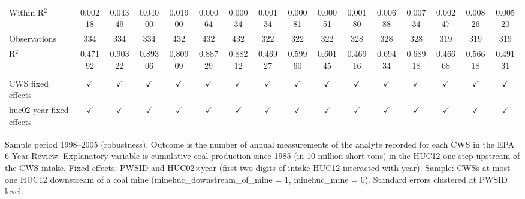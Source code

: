 \begin{table}[htbp]
\begin{adjustbox}{width = \textwidth, center}
\begin{tabular}{lccccccccccccccc}
          \\
         
         Within R$^2$                        & 0.00218           & 0.04349            & 0.04000           & 0.01900           & 0.00064            & 0.00034           & 0.00134           & 0.00081            & 0.00051           & 0.00180           & 0.00688            & 0.00734           & 0.00247           & 0.00826            & 0.00520\\  
         Observations                        & 334               & 334                & 334               & 432               & 432                & 432               & 322               & 322                & 322               & 328               & 328                & 328               & 319               & 319                & 319\\  
         R$^2$                               & 0.47192           & 0.90322            & 0.89306           & 0.80909           & 0.88729            & 0.88212           & 0.46927           & 0.59960            & 0.60145           & 0.46916           & 0.69434            & 0.68918           & 0.46668           & 0.56618            & 0.49131\\  
         
          \\
         
         CWS fixed effects                   & $\checkmark$      & $\checkmark$       & $\checkmark$      & $\checkmark$      & $\checkmark$       & $\checkmark$      & $\checkmark$      & $\checkmark$       & $\checkmark$      & $\checkmark$      & $\checkmark$       & $\checkmark$      & $\checkmark$      & $\checkmark$       & $\checkmark$\\   
         huc02-year fixed effects            & $\checkmark$      & $\checkmark$       & $\checkmark$      & $\checkmark$      & $\checkmark$       & $\checkmark$      & $\checkmark$      & $\checkmark$       & $\checkmark$      & $\checkmark$      & $\checkmark$       & $\checkmark$      & $\checkmark$      & $\checkmark$       & $\checkmark$\\   
         
         \bottomrule
         
      \end{tabular}
      
      
      
   \end{adjustbox}
      {\tiny\linespread{1}\selectfont \par \raggedright 
   Sample period 1998--2005 (robustness). Outcome is the number of annual measurements of the analyte recorded for each CWS in the EPA 6-Year Review. Explanatory variable is cumulative coal production since 1985 (in 10 million short tons) in the HUC12 one step upstream of the CWS intake. Fixed effects: PWSID and HUC02$\times$year (first two digits of intake HUC12 interacted with year). Sample: CWSs at most one HUC12 downstream of a coal mine (minehuc\_downstream\_of\_mine = 1, minehuc\_mine = 0). Standard errors clustered at PWSID level.}
   
\end{table}


